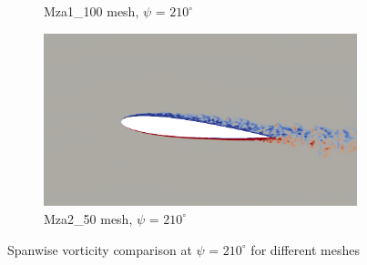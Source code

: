 \begin{figure}[H]
\begin{subfigure}[b]{0.475\textwidth}
		\caption{Mza1\_100 mesh, $\psi$ = $210^\circ$}
		\label{fig:Mza1_100_Re200k_sp_psi210}
	\end{subfigure}
	\begin{subfigure}[b]{0.475\textwidth}
		\centering
		\includegraphics[width=1\textwidth]{figures/zonal_adapt_results/vorticity_plots_Re200k/Mza2_50/phase_210.png}
		\caption{Mza2\_50 mesh, $\psi$ = $210^\circ$}
		\label{fig:Mza2_50_Re200k_sp_psi210}
	\end{subfigure}	
	\caption{Spanwise vorticity comparison at $\psi$ = $210^\circ$ for different meshes}
	\label{fig:vorticity_Re200k_sp_210}
\end{figure}



